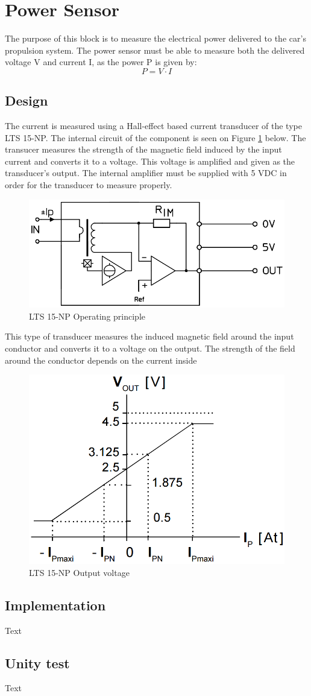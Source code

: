 \newpage
\section{Power Sensor}
The purpose of this block is to measure the electrical power delivered to the car's propulsion system. The power sensor must be able to measure both the delivered voltage V and  current I, as the power P is given by:
\begin{equation}
	P = V \cdot I
\end{equation}

\subsection{Design}
The current is measured using a Hall-effect based current transducer of the type LTS 15-NP. The internal circuit of the component is seen on Figure \ref{fig:LTS_operating_principle} below. The transucer measures the strength of the magnetic field induced by the input current and converts it to a voltage. This voltage is amplified and given as the transducer's output. The internal amplifier must be supplied with 5 VDC in order for the transducer to measure properly.

\begin{figure}[H]
	\centering
	\includegraphics[width=0.5\linewidth]{Hardware/Pictures/LTS_circuit}
	\caption{LTS 15-NP Operating principle}
	\label{fig:LTS_operating_principle}
\end{figure}

This type of transducer measures the induced magnetic field around the input conductor and converts it to a voltage on the output. The strength of the field around the conductor depends on the current inside

\begin{figure}[H]
	\centering
	\includegraphics[width=0.5\linewidth]{Hardware/Pictures/LTS_output}
	\caption{LTS 15-NP Output voltage}
	\label{fig:LTS_output}
\end{figure}

\subsection{Implementation}
Text

\subsection{Unity test}
Text